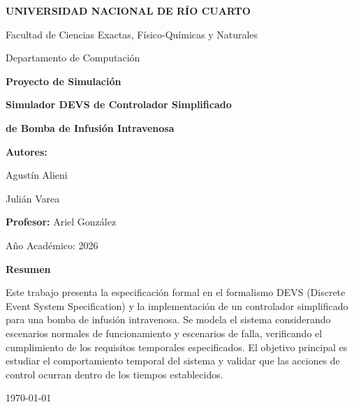 \documentclass[12pt,a4paper,oneside]{report}
\begin{document}
\begin{titlepage}
    \centering
    \vspace*{2cm}
    
    {\Large \textbf{UNIVERSIDAD NACIONAL DE RÍO CUARTO}}
    
    {\large Facultad de Ciencias Exactas, Físico-Químicas y Naturales}
    
    {\large Departamento de Computación}
    
    \vspace{2cm}
    
    {\Large \textbf{Proyecto de Simulación}}
    
    \vspace{1.5cm}
    
    {\huge \textbf{Simulador DEVS de Controlador Simplificado}}
    
    {\LARGE \textbf{de Bomba de Infusión Intravenosa}}
    
    \vspace{2cm}
    
    {\large \textbf{Autores:}}
    
    {\large Agustín Alieni}
    
    {\large Julián Varea}
    
    \vspace{1cm}
    
    {\large \textbf{Profesor:} Ariel González}
    
    \vspace{2cm}
    
    {\large Año Académico: 2026}
    
    \vspace{2cm}
    
    \textbf{Resumen}
    
    \small{
    Este trabajo presenta la especificación formal en el formalismo DEVS (Discrete Event System Specification) y la implementación de un controlador simplificado para una bomba de infusión intravenosa. Se modela el sistema considerando escenarios normales de funcionamiento y escenarios de falla, verificando el cumplimiento de los requisitos temporales especificados. El objetivo principal es estudiar el comportamiento temporal del sistema y validar que las acciones de control ocurran dentro de los tiempos establecidos.
    }
    
    \vfill
    
    \today
    
\end{titlepage}
\end{document}
